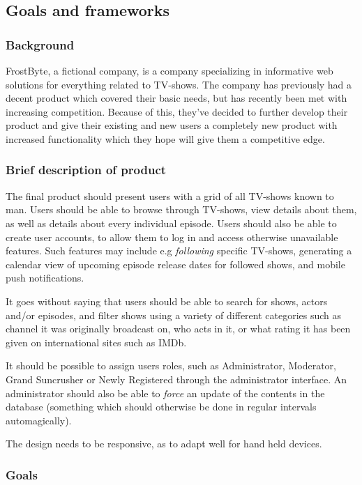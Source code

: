 \subsection{Goals and frameworks}
\subsubsection{Background}
FrostByte, a fictional company,  is a company specializing in informative web solutions for everything related to TV-shows.
The company has previously had a decent product which covered their basic needs, but has recently been met with increasing competition. Because of this, they’ve decided to further develop their product and give their existing and new users a completely new product with increased functionality which they hope will give them a competitive edge.

\subsubsection{Brief description of product}
The final product should present users with a grid of all TV-shows known to man. Users should be able to browse through TV-shows, view details about them, as well as details about every individual episode.
Users should also be able to create user accounts, to allow them to log in and access otherwise unavailable features. Such features may include e.g \textit{following} specific TV-shows, generating a calendar view of upcoming episode release dates for followed shows, and mobile push notifications.

It goes without saying that users should be able to search for shows, actors and/or episodes, and filter shows using a variety of different categories such as channel it was originally broadcast on, who acts in it, or what rating it has been given on international sites such as IMDb.

It should be possible to assign users roles, such as Administrator, Moderator, Grand Suncrusher or Newly Registered through the administrator interface. An administrator should also be able to \textit{force} an update of the contents in the database (something which should otherwise be done in regular intervals automagically). 

The design needs to be responsive, as to adapt well for hand held devices.

\subsubsection{Goals}

